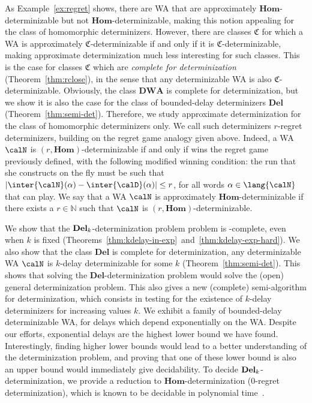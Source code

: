 \documentclass[a4paper]{article}
\begin{document}
As Example~\ref{ex:regret} shows, there are WA that are approximately
$\mathbf{Hom}$-determinizable but not $\mathbf{Hom}$-determinizable, making
this notion appealing for the class of homomorphic determinizers. However,
there are classes $\mathfrak{C}$ for which a WA is approximately
$\mathfrak{C}$-determinizable if and only if it is
$\mathfrak{C}$-determinizable, making approximate determinization much less
interesting for such classes. This is the case for classes $\mathfrak{C}$ which
are \emph{complete for determinization} (Theorem~\ref{thm:rclose}), in the sense
that any determinizable WA is also $\mathfrak{C}$-determinizable. Obviously, the
class $\mathbf{DWA}$ is complete for determinization, but we show it is also the
case for the class of bounded-delay determinizers $\mathbf{Del}$
(Theorem~\ref{thm:semi-det}).
%
Therefore, we study approximate determinization for the class of homomorphic
determinizers only. We call such determinizers $r$-regret
determinizers, building on the regret game analogy given above. Indeed, a WA
$\calN$ is $(r,\mathbf{Hom})$-determinizable if and only if \eve wins the regret game
previously defined, with the following modified winning condition: the run that she
constructs on the fly must be such that
$|\inter{\calN}(\alpha)-\inter{\calD}(\alpha)|\leq r$, for all words $\alpha \in
\lang{\calN}$ that \adam can play.
We say that a WA $\calN$ is approximately $\mathbf{Hom}$-determinizable if
there exists a $r \in \mathbb{N}$ such that $\calN$ is
$(r,\mathbf{Hom})$-determinizable.


 We show that the ${\bf Del}_k$-determinization problem
problem is \EXP-complete, even when $k$ is fixed
(Theorems~\ref{thm:kdelay-in-exp}~and~\ref{thm:kdelay-exp-hard}).
We also show that the class $\mathbf{Del}$ is
complete for determinization, \ie any determinizable WA $\calN$
is $k$-delay determinizable for some $k$ (Theorem~\ref{thm:semi-det}). This shows that
solving the $\mathbf{Del}$-determinization problem would solve the
(open) general determinization problem. This also gives a new
(complete) semi-algorithm for determinization, which consists in testing for the
existence of $k$-delay determinizers for increasing values $k$.  %
We exhibit a family of bounded-delay determinizable WA, for delays
which depend exponentially on the WA. Despite our efforts, exponential delays
are the highest lower bound we have found. Interestingly, finding higher lower
bounds would lead to a better understanding of the determinization
problem, and proving that one of these lower bound is also an upper bound would
immediately give decidability. 
To decide ${\bf Del}_k$-determinization, we provide
a reduction to $\mathbf{Hom}$-determinization (\ie $0$-regret determinization),
which is known to be decidable in polynomial time~\cite{akl10}. 
\end{document}
